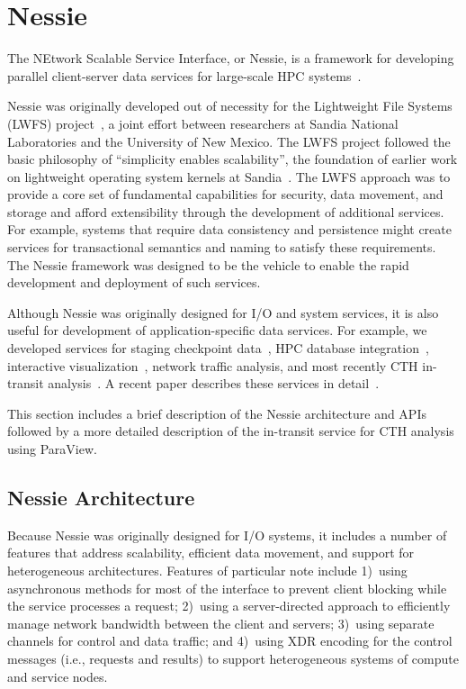 \section{Nessie}
\label{sec:Nessie}

The NEtwork Scalable Service Interface, or Nessie, is a framework for developing
parallel client-server data services for large-scale HPC
systems~\cite{lofstead:2011:nessie-staging,oldfield:lwfs-data-movement,oldfield:2012:uGNI}. 

Nessie was originally developed out of necessity for the Lightweight File
Systems (LWFS) project~\cite{oldfield:lwfs}, a joint effort between researchers
at Sandia National Laboratories and the University of New Mexico. The LWFS
project followed the basic philosophy of ``simplicity enables scalability'',
the foundation of earlier work on lightweight operating system kernels at
Sandia~\cite{riesen:ccpe-lwk}. The LWFS approach was to provide a core set of
fundamental capabilities for security, data movement, and storage and afford
extensibility through the development of additional services. For example,
systems that require data consistency and persistence might create services for
transactional semantics and naming to satisfy these requirements. The Nessie
framework was designed to be the vehicle to enable the rapid development and 
deployment of such services.  


Although Nessie was originally designed for I/O and system services, it is also
useful for development of application-specific data services.  For example, 
we developed services for staging checkpoint
data~\cite{oldfield:ft-ldrd-tr,reiss:checkpoint-proxy,oldfield:modeling_checkpoints},
HPC database integration~\cite{oldfield:sql-proxy}, interactive
visualization~\cite{oldfield:multilingual-siam}, network traffic analysis, and 
most recently CTH in-transit analysis~\cite{moreland:2011:in-transit}.  A recent
paper describes these services in detail~\cite{lofstead:2013:data-staging}.


This section includes a brief description of the Nessie architecture and APIs followed
by a more detailed description of the in-transit service for CTH analysis using 
ParaView.  


\subsection{Nessie Architecture}

Because Nessie was originally designed for I/O systems, it includes a number of
features that address scalability, efficient data movement, and support for
heterogeneous architectures. Features of particular note include 1)~using
asynchronous methods for most of the interface to prevent client blocking while
the service processes a request; 2)~using a server-directed approach to
efficiently manage network bandwidth between the client and servers; 3)~using
separate channels for control and data traffic; and 4)~using XDR encoding for
the control messages (i.e., requests and results) to support heterogeneous
systems of compute and service nodes.

